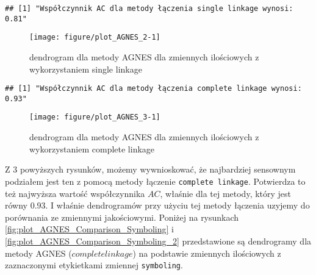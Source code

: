 \documentclass[12pt, a4paper]{article}\usepackage[]{graphicx}\usepackage[]{xcolor}
\makeatletter
\def\maxwidth{ %
  \ifdim\Gin@nat@width>\linewidth
    \linewidth
  \else
    \Gin@nat@width
  \fi
}
\newenvironment{kframe}{%
 \def\at@end@of@kframe{}%
 \ifinner\ifhmode%
  \def\at@end@of@kframe{\end{minipage}}%
  \begin{minipage}{\columnwidth}%
 \fi\fi%
 \def\FrameCommand##1{\hskip\@totalleftmargin \hskip-\fboxsep
 \colorbox{shadecolor}{##1}\hskip-\fboxsep
     \hskip-\linewidth \hskip-\@totalleftmargin \hskip\columnwidth}%
 \MakeFramed {\advance\hsize-\width
   \@totalleftmargin\z@ \linewidth\hsize
   \@setminipage}}%
 {\par\unskip\endMakeFramed%
 \at@end@of@kframe}
\newenvironment{knitrout}{}{} %
\makeatother
\begin{document}
\begin{knitrout}
\color{fgcolor}\begin{kframe}
\begin{verbatim}
## [1] "Współczynnik AC dla metody łączenia single linkage wynosi: 0.81"
\end{verbatim}
\end{kframe}\begin{figure}[H]

{\centering \texttt{[image: figure/plot\_AGNES\_2-1]} 

}

\caption[dendrogram dla metody AGNES dla zmiennych ilościowych z wykorzystaniem single linkage]{dendrogram dla metody AGNES dla zmiennych ilościowych z wykorzystaniem single linkage}\label{fig:plot_AGNES_2}
\end{figure}

\end{knitrout}

\begin{knitrout}
\color{fgcolor}\begin{kframe}
\begin{verbatim}
## [1] "Współczynnik AC dla metody łączenia complete linkage wynosi: 0.93"
\end{verbatim}
\end{kframe}\begin{figure}[H]

{\centering \texttt{[image: figure/plot\_AGNES\_3-1]} 

}

\caption[dendrogram dla metody AGNES dla zmiennych ilościowych z wykorzystaniem complete linkage]{dendrogram dla metody AGNES dla zmiennych ilościowych z wykorzystaniem complete linkage}\label{fig:plot_AGNES_3}
\end{figure}

\end{knitrout}

Z $3$ powyższych rysunków, możemy wywnioskować, że najbardziej sensownym podziałem jest ten z pomocą metody łączenie \texttt{complete linkage}. Potwierdza to też najwyższa wartość współczynnika $AC$, właśnie dla tej metody, który jest równy $0.93$. I właśnie dendrogramów przy użyciu tej metody łączenia uzyjemy do porównania ze zmiennymi jakościowymi. Poniżej na rysunkach \ref{fig:plot_AGNES_Comparison_Symboling} i \ref{fig:plot_AGNES_Comparison_Symboling_2} przedstawione są dendrogramy dla metody AGNES ($complete linkage$) na podstawie zmiennych ilościowych z zaznaczonymi etykietkami zmiennej \texttt{symboling}.
\end{document}
